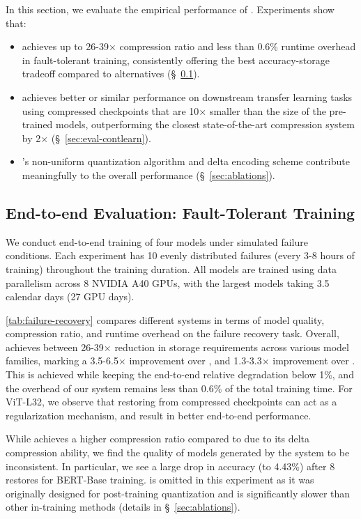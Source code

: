 In this section, we evaluate the empirical performance of \sys. Experiments show that: 

\begin{itemize}
\item \sys achieves up to 26-39× compression ratio and less than 0.6\% runtime overhead in fault-tolerant training, consistently offering the best accuracy-storage tradeoff compared to alternatives (\S~\ref{sec:eval-fr}).
\item \sys achieves better or similar performance on downstream transfer learning tasks using compressed checkpoints that are 10$\times$ smaller than the size of the pre-trained models, outperforming the closest state-of-the-art compression system by 2$\times$ (\S~\ref{sec:eval-contlearn}).
\item \sys's non-uniform quantization algorithm and delta encoding scheme contribute meaningfully to the overall performance (\S~\ref{sec:ablations}).
\end{itemize}



\subsection{End-to-end Evaluation: Fault-Tolerant Training}
\label{sec:eval-fr}

We conduct end-to-end training of four models under simulated failure conditions. Each experiment has 10 evenly distributed failures (every 3-8 hours of training) throughout the training duration. All models are trained using data parallelism across 8 NVIDIA A40 GPUs, with the largest models taking 3.5 calendar days (27 GPU days). 



\cref{tab:failure-recovery} compares different systems in terms of model quality, compression ratio, and runtime overhead on the failure recovery task. Overall, \sys achieves between 26-39$\times$ reduction in storage requirements across various model families, marking a 3.5-6.5$\times$ improvement over \CNR, and 1.3-3.3$\times$ improvement over \QD. This is achieved while keeping the end-to-end relative degradation below 1\%, and the overhead of our system remains less than 0.6\% of the total training time. For ViT-L32, we observe that restoring from compressed checkpoints can act as a regularization mechanism, and result in better end-to-end performance.

While \QD achieves a higher compression ratio compared to \CNR due to its delta compression ability, we find the quality of models generated by the system to be inconsistent. In particular, we see a large drop in accuracy (to 4.43\%) after 8 restores for BERT-Base training. \GOBO is omitted in this experiment as it was originally designed for post-training quantization and is significantly slower than other in-training methods (details in \S~\ref{sec:ablations}).


